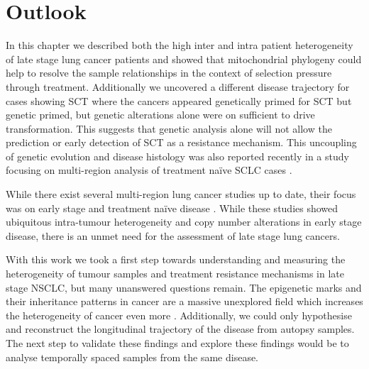 \section{Outlook}
\label{cascade-sec:outlook}

In this chapter we described both the high inter and intra patient heterogeneity of late stage lung cancer patients and showed that mitochondrial phylogeny could help to resolve the sample relationships in the context of selection pressure through treatment. Additionally we uncovered a different disease trajectory for cases showing SCT where the cancers appeared genetically primed for SCT but genetic primed, but genetic alterations alone were on sufficient to drive transformation. This suggests that genetic analysis alone will not allow the prediction or early detection of SCT as a resistance mechanism. This uncoupling of genetic evolution and disease histology was also reported recently in a study focusing on multi-region analysis of treatment na\"ive SCLC cases \cite{Zhou2021}.

While there exist several multi-region lung cancer studies up to date, their focus was on early stage and treatment na\"ive disease \cite{JamalHanjani2017,Leong2018}. While these studies showed ubiquitous intra-tumour heterogeneity and copy number alterations in early stage disease, there is an unmet need for the assessment of late stage lung cancers.

With this work we took a first step towards understanding and measuring the heterogeneity of tumour samples and treatment resistance mechanisms in late stage NSCLC, but many unanswered questions remain. The epigenetic marks and their inheritance patterns in cancer are a massive unexplored field which increases the heterogeneity of cancer even more \cite{Easwaran2014}. Additionally, we could only hypothesise and reconstruct the longitudinal trajectory of the disease from autopsy samples. The next step to validate these findings and explore these findings would be to analyse temporally spaced samples from the same disease.